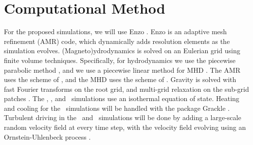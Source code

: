 \section{Computational Method}
\label{sec.method}

For the proposed simulations, we will use Enzo \citep{Collins10, Bryan14}.  Enzo
is an adaptive mesh refinement (AMR) code, which dynamically adds resolution
elements as the simulation evolves.  (Magneto)ydrodynamics is solved on an Eulerian grid
using finite volume techniques.  Specifically, for hydrodynamics we use the
piecewise parabolic method \citep{Colella84}, and we use a piecewise linear
method for MHD \citep{Li08a}.  The AMR uses the scheme of \citet{Berger89}, and
the MHD uses the scheme of \citet{Balsara01}.  Gravity is solved with fast
Fourier transforms on the root grid, and multi-grid relaxation on the sub-grid
patches \citep{Bryan14}.  
The \nameTurbulence, \nameCores, and  \nameCMB\ simulations use an isothermal
equation of state.  Heating and cooling for the \nameGalaxies\ simulations will
be handled with the package Grackle \citep{Smith17}.
Turbulent driving in the \nameTurbulence\ and \nameCMB\ simulations will be
done by adding a large-scale random velocity field at every time step, with the
velocity field evolving using an Ornstein-Uhlenbeck process \citep{Schmidt09}.




